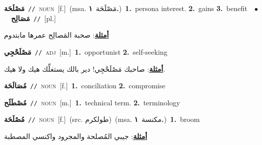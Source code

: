 \documentclass[10pt,a4paper,twoside]{article} %
\begin{document}
\begin{multicols}{2}
{\setlength\topsep{0pt}\textbf{\foreignlanguage{arabic}{مَصْلَحَة}}\ {\color{gray}\texttt{//}\color{black}}\ \textsc{noun}\ [f.]\ \color{gray}(msa. \foreignlanguage{arabic}{مَصْلَحَة}~\foreignlanguage{arabic}{\textbf{١.}})\color{black}\ \textbf{1.}~persona interest.  \textbf{2.}~gains  \textbf{3.}~benefit\ \ $\bullet$\ \ \setlength\topsep{0pt}\textbf{\foreignlanguage{arabic}{مَصَالِح}}\ {\color{gray}\texttt{//}\color{black}}\ [pl.]\  \begin{flushright}\color{gray}\foreignlanguage{arabic}{\textbf{\underline{\foreignlanguage{arabic}{أمثلة}}}: صحبة المَصالِح عمرها مابتدوم}\end{flushright}\color{black}} \vspace{2mm}

{\setlength\topsep{0pt}\textbf{\foreignlanguage{arabic}{مَصْلَحْجِي}}\ {\color{gray}\texttt{//}\color{black}}\ \textsc{adj}\ [m.]\ \textbf{1.}~opportunist  \textbf{2.}~self-seeking\  \begin{flushright}\color{gray}\foreignlanguage{arabic}{\textbf{\underline{\foreignlanguage{arabic}{أمثلة}}}: صاحبك مَصْلَحْجِي! دير بالك يستغلِّك هيك ولا هيك.}\end{flushright}\color{black}} \vspace{2mm}

{\setlength\topsep{0pt}\textbf{\foreignlanguage{arabic}{مُصَالَحَة}}\ {\color{gray}\texttt{//}\color{black}}\ \textsc{noun}\ [f.]\ \textbf{1.}~conciliation  \textbf{2.}~compromise\ } \vspace{2mm}

{\setlength\topsep{0pt}\textbf{\foreignlanguage{arabic}{مُصْطَلَح}}\ {\color{gray}\texttt{//}\color{black}}\ \textsc{noun}\ [m.]\ \textbf{1.}~technical term.  \textbf{2.}~terminology\ } \vspace{2mm}

{\setlength\topsep{0pt}\textbf{\foreignlanguage{arabic}{مُصْلَحَة}}\ {\color{gray}\texttt{//}\color{black}}\ \textsc{noun}\ [f.]\ (src. \color{gray}\foreignlanguage{arabic}{طولكرم}\color{black})\ \color{gray}(msa. \foreignlanguage{arabic}{مكنسة}~\foreignlanguage{arabic}{\textbf{١.}})\color{black}\ \textbf{1.}~broom\  \begin{flushright}\color{gray}\foreignlanguage{arabic}{\textbf{\underline{\foreignlanguage{arabic}{أمثلة}}}: جيبي المُصلحة والمجرود واكنسي المصطبة}\end{flushright}\color{black}} \vspace{2mm}


\end{multicols}
\end{document}
